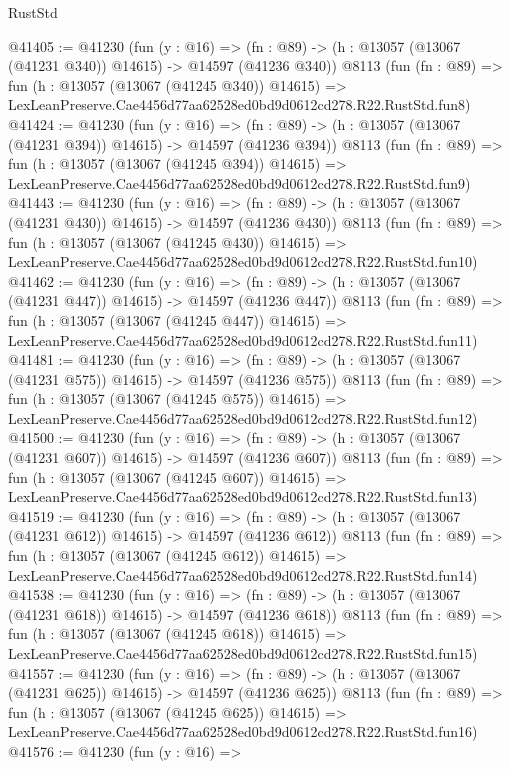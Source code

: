 \begin{lexlean}{RustStd}
\begin{coremodule}
@41405 := @41230
    (fun (y : @16) =>
    (fn : @89) -> (h : @13057 (@13067 (@41231 @340)) @14615) -> @14597 (@41236 @340))
    @8113
    (fun (fn : @89) =>
    fun (h : @13057 (@13067 (@41245 @340)) @14615) =>
    LexLeanPreserve.Cae4456d77aa62528ed0bd9d0612cd278.R22.RustStd.fun8)
@41424 := @41230
    (fun (y : @16) =>
    (fn : @89) -> (h : @13057 (@13067 (@41231 @394)) @14615) -> @14597 (@41236 @394))
    @8113
    (fun (fn : @89) =>
    fun (h : @13057 (@13067 (@41245 @394)) @14615) =>
    LexLeanPreserve.Cae4456d77aa62528ed0bd9d0612cd278.R22.RustStd.fun9)
@41443 := @41230
    (fun (y : @16) =>
    (fn : @89) -> (h : @13057 (@13067 (@41231 @430)) @14615) -> @14597 (@41236 @430))
    @8113
    (fun (fn : @89) =>
    fun (h : @13057 (@13067 (@41245 @430)) @14615) =>
    LexLeanPreserve.Cae4456d77aa62528ed0bd9d0612cd278.R22.RustStd.fun10)
@41462 := @41230
    (fun (y : @16) =>
    (fn : @89) -> (h : @13057 (@13067 (@41231 @447)) @14615) -> @14597 (@41236 @447))
    @8113
    (fun (fn : @89) =>
    fun (h : @13057 (@13067 (@41245 @447)) @14615) =>
    LexLeanPreserve.Cae4456d77aa62528ed0bd9d0612cd278.R22.RustStd.fun11)
@41481 := @41230
    (fun (y : @16) =>
    (fn : @89) -> (h : @13057 (@13067 (@41231 @575)) @14615) -> @14597 (@41236 @575))
    @8113
    (fun (fn : @89) =>
    fun (h : @13057 (@13067 (@41245 @575)) @14615) =>
    LexLeanPreserve.Cae4456d77aa62528ed0bd9d0612cd278.R22.RustStd.fun12)
@41500 := @41230
    (fun (y : @16) =>
    (fn : @89) -> (h : @13057 (@13067 (@41231 @607)) @14615) -> @14597 (@41236 @607))
    @8113
    (fun (fn : @89) =>
    fun (h : @13057 (@13067 (@41245 @607)) @14615) =>
    LexLeanPreserve.Cae4456d77aa62528ed0bd9d0612cd278.R22.RustStd.fun13)
@41519 := @41230
    (fun (y : @16) =>
    (fn : @89) -> (h : @13057 (@13067 (@41231 @612)) @14615) -> @14597 (@41236 @612))
    @8113
    (fun (fn : @89) =>
    fun (h : @13057 (@13067 (@41245 @612)) @14615) =>
    LexLeanPreserve.Cae4456d77aa62528ed0bd9d0612cd278.R22.RustStd.fun14)
@41538 := @41230
    (fun (y : @16) =>
    (fn : @89) -> (h : @13057 (@13067 (@41231 @618)) @14615) -> @14597 (@41236 @618))
    @8113
    (fun (fn : @89) =>
    fun (h : @13057 (@13067 (@41245 @618)) @14615) =>
    LexLeanPreserve.Cae4456d77aa62528ed0bd9d0612cd278.R22.RustStd.fun15)
@41557 := @41230
    (fun (y : @16) =>
    (fn : @89) -> (h : @13057 (@13067 (@41231 @625)) @14615) -> @14597 (@41236 @625))
    @8113
    (fun (fn : @89) =>
    fun (h : @13057 (@13067 (@41245 @625)) @14615) =>
    LexLeanPreserve.Cae4456d77aa62528ed0bd9d0612cd278.R22.RustStd.fun16)
@41576 := @41230
    (fun (y : @16) =>

\end{coremodule}
\end{lexlean}
